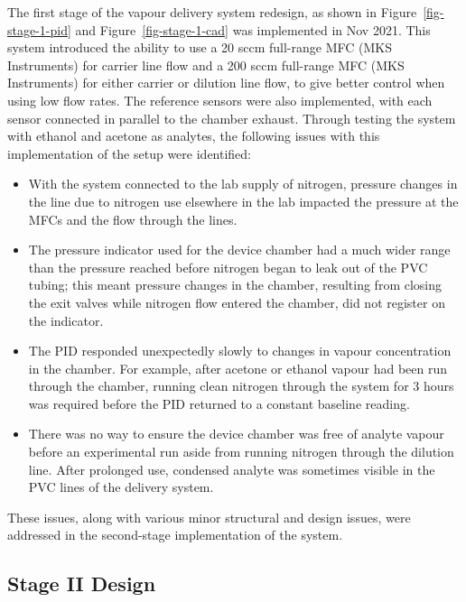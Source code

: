 \documentclass[
  a4paper,
]{scrbook}
\begin{document}
The first stage of the vapour delivery system redesign, as shown in
Figure~\ref{fig-stage-1-pid} and Figure~\ref{fig-stage-1-cad} was
implemented in Nov 2021. This system introduced the ability to use a 20
sccm full-range MFC (MKS Instruments) for carrier line flow and a 200
sccm full-range MFC (MKS Instruments) for either carrier or dilution
line flow, to give better control when using low flow rates. The
reference sensors were also implemented, with each sensor connected in
parallel to the chamber exhaust. Through testing the system with ethanol
and acetone as analytes, the following issues with this implementation
of the setup were identified:

\begin{itemize}
\item
  With the system connected to the lab supply of nitrogen, pressure
  changes in the line due to nitrogen use elsewhere in the lab impacted
  the pressure at the MFCs and the flow through the lines.
\item
  The pressure indicator used for the device chamber had a much wider
  range than the pressure reached before nitrogen began to leak out of
  the PVC tubing; this meant pressure changes in the chamber, resulting
  from closing the exit valves while nitrogen flow entered the chamber,
  did not register on the indicator.
\item
  The PID responded unexpectedly slowly to changes in vapour
  concentration in the chamber. For example, after acetone or ethanol
  vapour had been run through the chamber, running clean nitrogen
  through the system for 3 hours was required before the PID returned to
  a constant baseline reading.
\item
  There was no way to ensure the device chamber was free of analyte
  vapour before an experimental run aside from running nitrogen through
  the dilution line. After prolonged use, condensed analyte was
  sometimes visible in the PVC lines of the delivery system.
\end{itemize}

These issues, along with various minor structural and design issues,
were addressed in the second-stage implementation of the system.

\hypertarget{stage-ii-design}{%
\subsection{Stage II Design}\label{stage-ii-design}}
\end{document}
